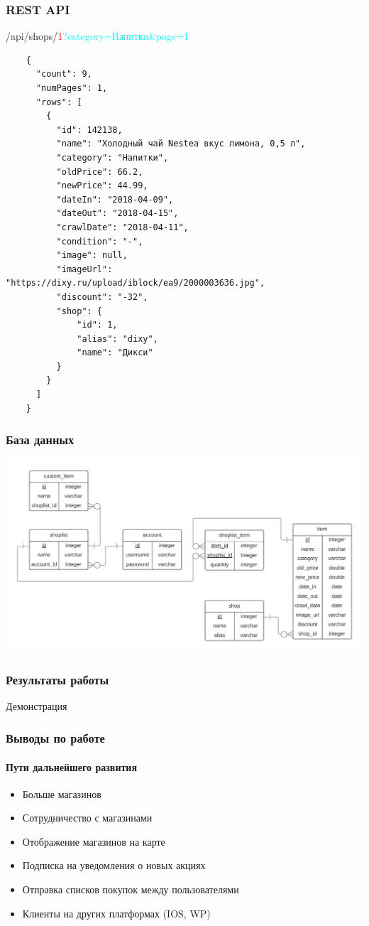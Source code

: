 \documentclass{beamer}
\begin{document}
\begin{frame}[fragile]
    \frametitle{REST API}

    /api/shops/\textcolor{red}{1}\textcolor{cyan}{?category=Напитки\&page=1}
    \medskip
    \begin{verbatim}
    {
      "count": 9,
      "numPages": 1,
      "rows": [
        {
          "id": 142138,
          "name": "Холодный чай Nestea вкус лимона, 0,5 л",
          "category": "Напитки",
          "oldPrice": 66.2,
          "newPrice": 44.99,
          "dateIn": "2018-04-09",
          "dateOut": "2018-04-15",
          "crawlDate": "2018-04-11",
          "condition": "-",
          "image": null,
          "imageUrl": "https://dixy.ru/upload/iblock/ea9/2000003636.jpg",
          "discount": "-32",
          "shop": {
              "id": 1,
              "alias": "dixy",
              "name": "Дикси"
          }
        }
      ]
    }
    \end{verbatim}
\end{frame}

\begin{frame}
    \frametitle{База данных}
    \medskip
    \begin{center}
      \includegraphics[width=\linewidth]{database}
    \end{center}
\end{frame}

\begin{frame}[c]
    \frametitle{Результаты работы}
    \begin{center}
        Демонстрация
    \end{center}
\end{frame}

\begin{frame}
    \frametitle{Выводы по работе}
    \framesubtitle{Пути дальнейшего развития}
    \begin{itemize}
        \item Больше магазинов
        \item Сотрудничество с магазинами
        \item Отображение магазинов на карте
        \item Подписка на уведомления о новых акциях
        \item Отправка списков покупок между пользователями
        \item Клиенты на других платформах (IOS, WP)
    \end{itemize}
\end{frame}
\end{document}
